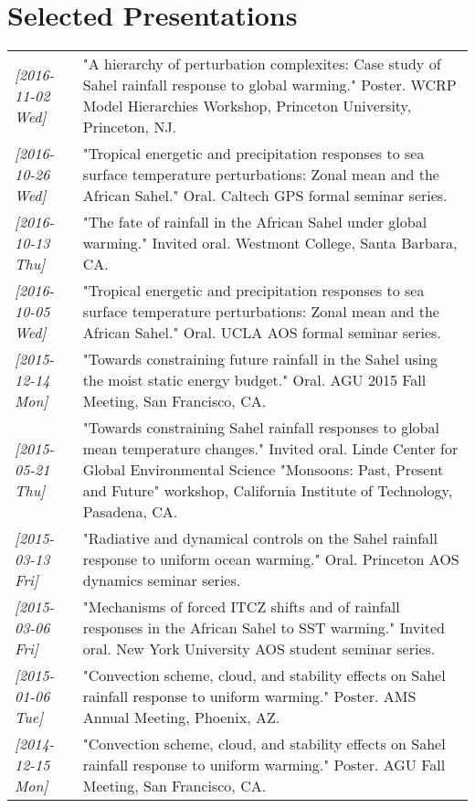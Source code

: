 \documentclass{article}
\begin{document}
\section*{Selected Presentations}
\label{sec:org209e5d1}
\begin{center}
\begin{tabularx}{\textwidth}{lX}
\textit{[2016-11-02 Wed]} & "A hierarchy of perturbation complexites: Case study of Sahel rainfall response to global warming."  Poster.  WCRP Model Hierarchies Workshop, Princeton University, Princeton, NJ.\\
\textit{[2016-10-26 Wed]} & "Tropical energetic and precipitation responses to sea surface temperature perturbations: Zonal mean and the African Sahel."  Oral.  Caltech GPS formal seminar series.\\
\textit{[2016-10-13 Thu]} & "The fate of rainfall in the African Sahel under global warming."  Invited oral.  Westmont College, Santa Barbara, CA.\\
\textit{[2016-10-05 Wed]} & "Tropical energetic and precipitation responses to sea surface temperature perturbations: Zonal mean and the African Sahel."  Oral.  UCLA AOS formal seminar series.\\
\textit{[2015-12-14 Mon]} & "Towards constraining future rainfall in the Sahel using the moist static energy budget." Oral.  AGU 2015 Fall Meeting, San Francisco, CA.\\
\textit{[2015-05-21 Thu]} & "Towards constraining Sahel rainfall responses to global mean temperature changes."  Invited oral.  Linde Center for Global Environmental Science "Monsoons: Past, Present and Future" workshop, California Institute of Technology, Pasadena, CA.\\
\textit{[2015-03-13 Fri]} & "Radiative and dynamical controls on the Sahel rainfall response to uniform ocean warming."  Oral.  Princeton AOS dynamics seminar series.\\
\textit{[2015-03-06 Fri]} & "Mechanisms of forced ITCZ shifts and of rainfall responses in the African Sahel to SST warming."  Invited oral.  New York University AOS student seminar series.\\
\textit{[2015-01-06 Tue]} & "Convection scheme, cloud, and stability effects on Sahel rainfall response to uniform warming."  Poster.  AMS Annual Meeting, Phoenix, AZ.\\
\textit{[2014-12-15 Mon]} & "Convection scheme, cloud, and stability effects on Sahel rainfall response to uniform warming."  Poster.  AGU Fall Meeting, San Francisco, CA.\\

\end{tabularx}
\end{center}
\end{document}
